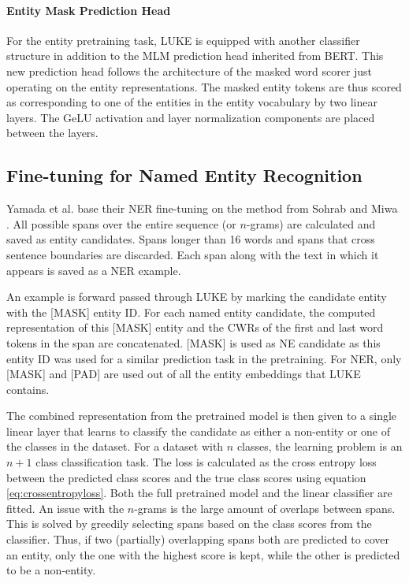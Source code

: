 \documentclass[main.tex]{subfiles}
\begin{document}
\paragraph{Entity Mask Prediction Head}
For the entity pretraining task, LUKE is equipped with another classifier structure in addition to the MLM prediction head inherited from BERT.
This new prediction head follows the architecture of the masked word scorer just operating on the entity representations.
The masked entity tokens are thus scored as corresponding to one of the entities in the entity vocabulary by two linear layers.
The GeLU activation \cite{hendrycks2020gelu} and layer normalization components are placed between the layers.

\subsection{Fine-tuning for Named Entity Recognition}
\label{subsec:fine-tuning-theory}
Yamada et al. base their NER fine-tuning on the method from Sohrab and Miwa \cite{sohrab2018nestedner}.
All possible spans over the entire sequence (or $n$-grams) are calculated and saved as entity candidates.
Spans longer than 16 words and spans that cross sentence boundaries are discarded.
Each span along with the text in which it appears is saved as a NER example.

An example is forward passed through LUKE by marking the candidate entity with the [MASK] entity ID.
For each named entity candidate, the computed representation of this [MASK] entity and the CWRs of the first and last word tokens in the span are concatenated.
[MASK] is used as NE candidate as this entity ID was used for a similar prediction task in the pretraining.
For NER, only [MASK] and [PAD] are used out of all the entity embeddings that LUKE contains.

The combined representation from the pretrained model is then given to a single linear layer that learns to classify the candidate as either a non-entity or one of the classes in the dataset.
For a dataset with $ n $ classes, the learning problem is an $ n+1 $ class classification task.
The loss is calculated as the cross entropy loss between the predicted class scores and the true class scores using equation \eqref{eq:crossentropyloss}.
Both the full pretrained model and the linear classifier are fitted.
An issue with the $ n $-grams is the large amount of overlaps between spans.
This is solved by greedily selecting spans based on the class scores from the classifier.
Thus, if two (partially) overlapping spans both are predicted to cover an entity, only the one with the highest score is kept, while the other is predicted to be a non-entity.

\end{document}
